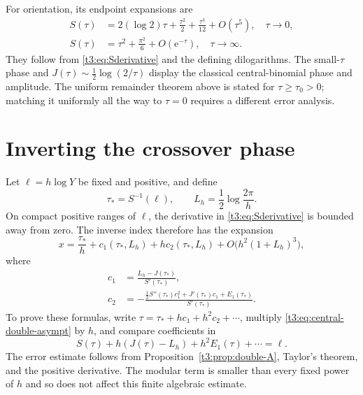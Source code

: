 \documentclass[11pt,openany]{book}
\numberwithin{equation}{chapter}
\theoremstyle{plain}
\theoremstyle{definition}
\theoremstyle{remark}
\newcommand{\ee}{\mathrm e}
\begin{document}
For orientation, its endpoint expansions are
\begin{align}
 S(\tau)&=2(\log2)\tau+\frac{\tau^2}{2}
                  +\frac{\tau^3}{12}+O(\tau^5),\quad\tau\to0,
 \label{t3:eq:Ssmall}\\
 S(\tau)&=\tau^2+\frac{\pi^2}{6}+O(\ee^{-\tau}),\quad\tau\to\infty.
 \label{t3:eq:Slarge}
\end{align}
They follow from \eqref{t3:eq:Sderivative} and the defining dilogarithms. The small-$\tau$ phase and $J(\tau)\sim\tfrac12\log(2/\tau)$ display the classical central-binomial phase and amplitude. The uniform remainder theorem above is stated for $\tau\ge\tau_0>0$; matching it uniformly all the way to $\tau=0$ requires a different error analysis.

\section{Inverting the crossover phase}

Let $\ell=h\log Y$ be fixed and positive, and define
\begin{equation}\label{t3:eq:crossover-center}
 \tau_*=S^{-1}(\ell),\qquad
 L_h=\frac12\log\frac{2\pi}{h}.
\end{equation}
On compact positive ranges of $\ell$, the derivative in \eqref{t3:eq:Sderivative} is bounded away from zero. The inverse index therefore has the expansion
\begin{equation}\label{t3:eq:crossover-inverse}
 x=\frac{\tau_*}{h}+c_1(\tau_*,L_h)
                         +h c_2(\tau_*,L_h)
                         +O\bigl(h^2(1+L_h)^3\bigr),
\end{equation}
where
\begin{align}
 c_1&=\frac{L_h-J(\tau_*)}{S'(\tau_*)},\label{t3:eq:crossover-c1}\\
 c_2&=-\frac{\tfrac12 S''(\tau_*)c_1^2
                  +J'(\tau_*)c_1+E_1(\tau_*)}{S'(\tau_*)}.
 \label{t3:eq:crossover-c2}
\end{align}
To prove these formulas, write $\tau=\tau_*+hc_1+h^2c_2+\cdots$, multiply \eqref{t3:eq:central-double-asympt} by $h$, and compare coefficients in
\[
 S(\tau)+h(J(\tau)-L_h)+h^2E_1(\tau)+\cdots=\ell.
\]
The error estimate follows from Proposition~\ref{t3:prop:double-A}, Taylor's theorem, and the positive derivative. The modular term is smaller than every fixed power of $h$ and so does not affect this finite algebraic estimate.
\end{document}
